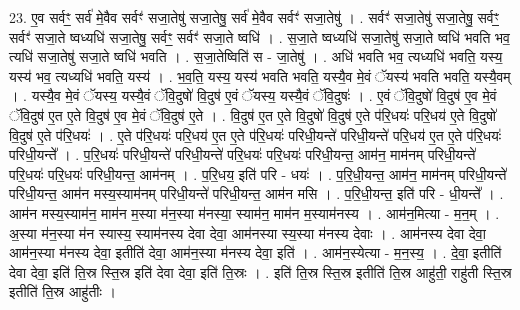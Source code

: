 \documentclass[17pt]{extarticle}
\begin{document}
23. ए॒व सर्वꣳ॒॒ सर्व॑ मे॒वैव सर्वꣳ॑ सजा॒तेषु॑ सजा॒तेषु॒ सर्व॑ मे॒वैव सर्वꣳ॑ सजा॒तेषु॑ । . सर्वꣳ॑ सजा॒तेषु॑ सजा॒तेषु॒ सर्वꣳ॒॒ सर्वꣳ॑ सजा॒ते ष्वध्यधि॑ सजा॒तेषु॒ सर्वꣳ॒॒ सर्वꣳ॑ सजा॒ते ष्वधि॑ । . स॒जा॒ते ष्वध्यधि॑ सजा॒तेषु॑ सजा॒ते ष्वधि॑ भवति भव॒ त्यधि॑ सजा॒तेषु॑ सजा॒ते ष्वधि॑ भवति । . स॒जा॒तेष्विति॑ स - जा॒तेषु॑ । . अधि॑ भवति भव॒ त्यध्यधि॑ भवति॒ यस्य॒ यस्य॑ भव॒ त्यध्यधि॑ भवति॒ यस्य॑ । . भ॒व॒ति॒ यस्य॒ यस्य॑ भवति भवति॒ यस्यै॒व मे॒वं ॅयस्य॑ भवति भवति॒ यस्यै॒वम् । . यस्यै॒व मे॒वं ॅयस्य॒ यस्यै॒वं ॅवि॒दुषो॑ वि॒दुष॑ ए॒वं ॅयस्य॒ यस्यै॒वं ॅवि॒दुषः॑ । . ए॒वं ॅवि॒दुषो॑ वि॒दुष॑ ए॒व मे॒वं ॅवि॒दुष॑ ए॒त ए॒ते वि॒दुष॑ ए॒व मे॒वं ॅवि॒दुष॑ ए॒ते । . वि॒दुष॑ ए॒त ए॒ते वि॒दुषो॑ वि॒दुष॑ ए॒ते प॑रि॒धयः॑ परि॒धय॑ ए॒ते वि॒दुषो॑ वि॒दुष॑ ए॒ते प॑रि॒धयः॑ । . ए॒ते प॑रि॒धयः॑ परि॒धय॑ ए॒त ए॒ते प॑रि॒धयः॑ परिधी॒यन्ते॑ परिधी॒यन्ते॑ परि॒धय॑ ए॒त ए॒ते प॑रि॒धयः॑ परिधी॒यन्ते᳚ । . प॒रि॒धयः॑ परिधी॒यन्ते॑ परिधी॒यन्ते॑ परि॒धयः॑ परि॒धयः॑ परिधी॒यन्त॒ आम॑न॒ माम॑नम् परिधी॒यन्ते॑ परि॒धयः॑ परि॒धयः॑ परिधी॒यन्त॒ आम॑नम् । . प॒रि॒धय॒ इति॑ परि - धयः॑ । . प॒रि॒धी॒यन्त॒ आम॑न॒ माम॑नम् परिधी॒यन्ते॑ परिधी॒यन्त॒ आम॑न मस्य॒स्याम॑नम् परिधी॒यन्ते॑ परिधी॒यन्त॒ आम॑न मसि । . प॒रि॒धी॒यन्त॒ इति॑ परि - धी॒यन्ते᳚ । . आम॑न मस्य॒स्याम॑न॒ माम॑न म॒स्या म॑न॒स्या म॑नस्या॒ स्याम॑न॒ माम॑न म॒स्याम॑नस्य । . आम॑न॒मित्या - म॒न॒म् । . अ॒स्या म॑न॒स्या म॑न स्यास्य॒ स्याम॑नस्य देवा देवा॒ आम॑नस्या स्य॒स्या म॑नस्य देवाः । . आम॑नस्य देवा देवा॒ आम॑न॒स्या म॑नस्य देवा॒ इतीति॑ देवा॒ आम॑न॒स्या म॑नस्य देवा॒ इति॑ । . आम॑न॒स्येत्या - म॒न॒स्य॒ । . दे॒वा॒ इतीति॑ देवा देवा॒ इति॑ ति॒स्र स्ति॒स्र इति॑ देवा देवा॒ इति॑ ति॒स्रः । . इति॑ ति॒स्र स्ति॒स्र इतीति॑ ति॒स्र आहु॑ती॒ राहु॑ती स्ति॒स्र इतीति॑ ति॒स्र आहु॑तीः । \newline
\end{document}
